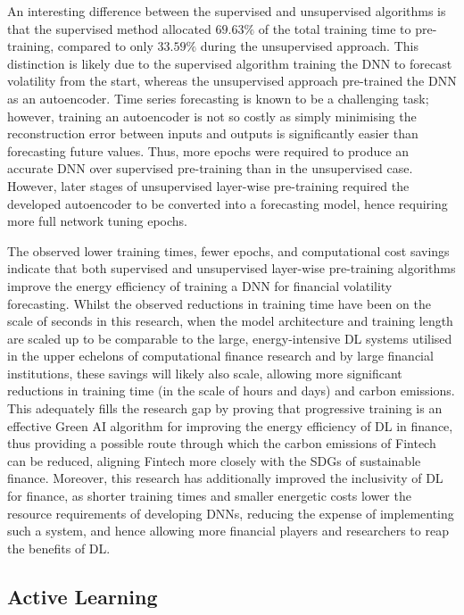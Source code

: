 \documentclass[a4paper, 11pt]{report}
\begin{document}
    An interesting difference between the supervised and unsupervised algorithms is that the supervised method allocated $69.63\%$ of the total training time to pre-training, compared to only $33.59\%$ during the unsupervised approach. This distinction is likely due to the supervised algorithm training the DNN to forecast volatility from the start, whereas the unsupervised approach pre-trained the DNN as an autoencoder. Time series forecasting is known to be a challenging task; however, training an autoencoder is not so costly as simply minimising the reconstruction error between inputs and outputs is significantly easier than forecasting future values. Thus, more epochs were required to produce an accurate DNN over supervised pre-training than in the unsupervised case. However, later stages of unsupervised layer-wise pre-training required the developed autoencoder to be converted into a forecasting model, hence requiring more full network tuning epochs.

    The observed lower training times, fewer epochs, and computational cost savings indicate that both supervised and unsupervised layer-wise pre-training algorithms improve the energy efficiency of training a DNN for financial volatility forecasting. Whilst the observed reductions in training time have been on the scale of seconds in this research, when the model architecture and training length are scaled up to be comparable to the large, energy-intensive DL systems utilised in the upper echelons of computational finance research and by large financial institutions, these savings will likely also scale, allowing more significant reductions in training time (in the scale of hours and days) and carbon emissions. This adequately fills the research gap by proving that progressive training is an effective Green AI algorithm for improving the energy efficiency of DL in finance, thus providing a possible route through which the carbon emissions of Fintech can be reduced, aligning Fintech more closely with the SDGs of sustainable finance. Moreover, this research has additionally improved the inclusivity of DL for finance, as shorter training times and smaller energetic costs lower the resource requirements of developing DNNs, reducing the expense of implementing such a system, and hence allowing more financial players and researchers to reap the benefits of DL.


    \subsection{Active Learning}
\end{document}
